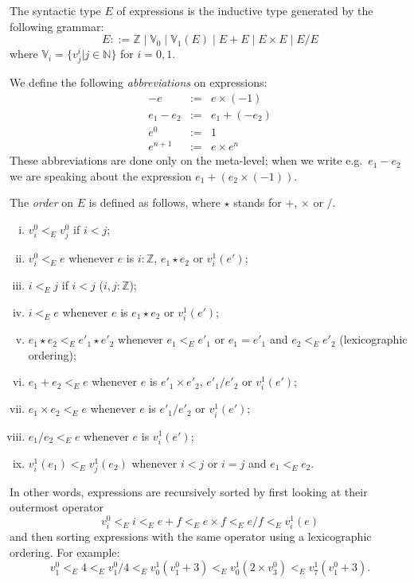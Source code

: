\documentclass[numreferences]{kluwer}
\newcommand{\alt}{\mathrel{|}}
\newcommand{\Z}{{\mathbb Z}}
\newcommand{\V}{{\mathbb V}}
\newcommand{\nat}{{\mathbb N}}
\begin{document}
\begin{article}
\begin{definition}\label{defn:expressions}
The syntactic type $E$ of expressions is the inductive type generated by the
following grammar:
\[E ::= \Z \alt \V_0 \alt \V_1(E) \alt E+E \alt E\times E \alt E/E\]
where $\V_i=\{v^i_j|j\in\nat\}$ for $i=0,1$.
\end{definition}

\begin{definition}\label{expr:abbr}
We define the following \emph{abbreviations} on expressions:
\begin{eqnarray}
\label{expr:inv} -e & := & e\times(-1)\\
\label{expr:minus} e_1-e_2 & := & e_1+(-e_2)\\
\label{expr:exp:zero} e^0 & := & 1\\
\label{expr:exp:suc} e^{n+1} & := & e\times e^n
\end{eqnarray}
These abbreviations are done only on the meta-level; when
we write e.g.\ $e_1-e_2$ we are speaking about the expression
$e_1+(e_2\times(-1))$.
\end{definition}

\begin{definition}\label{defn:exprorder}
The \emph{order} on $E$ is defined as follows, where $\star$ stands for $+$,
$\times$ or $/$.
\begin{enumerate}[(i)]
\item $v^0_i<_E v^0_j$ if $i<j$;
\item $v^0_i<_E e$ whenever $e$ is $i:\Z$, $e_1\star e_2$ or $v^1_i(e')$;
\item $i<_E j$ if $i<j$ ($i,j:\Z$);
\item $i<_E e$ whenever $e$ is $e_1\star e_2$ or $v^1_i(e')$;
\item $e_1\star e_2<_E e'_1\star e'_2$ whenever $e_1<_E e'_1$ or $e_1=e'_1$ and
$e_2<_E e'_2$ (lexicographic ordering);
\item $e_1+e_2<_E e$ whenever $e$ is $e'_1\times e'_2$, $e'_1/e'_2$
or $v^1_i(e')$;
\item $e_1\times e_2<_E e$ whenever $e$ is $e'_1/e'_2$ or $v^1_i(e')$;
\item $e_1/e_2<_E e$ whenever $e$ is $v^1_i(e')$;
\item $v^1_i(e_1)<_E v^1_j(e_2)$ whenever $i<j$ or $i=j$ and $e_1<_E e_2$.
\end{enumerate}
In other words, expressions are recursively sorted by first looking at
their outermost operator $$v^0_i <_E i <_E e+f <_E e\times f <_E e/f <_E
v^1_i(e)$$ and then sorting expressions with the same operator using a
lexicographic ordering.
For example:
$$v^0_1<_E 4<_E v^0_1/4<_E v^1_0(v^0_1+3)<_E v^1_0(2\times v^0_3)<_E v^1_7(v^0_1+3).$$
\end{definition}


\end{article}
\end{document}
